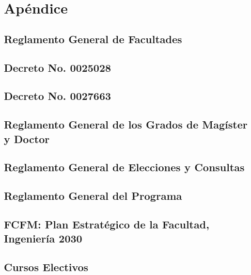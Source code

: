 \documentclass[11pt,fleqn]{book} %
\begin{document}
\iffalse

\appendix
{}
\chapter{Apéndice}

\section{Reglamento General de Facultades}\label{reg_gen_fac}


\section{Decreto No. 0025028}\label{dec25028}


\section{Decreto No. 0027663}\label{dec27663}


\section{Reglamento General de los Grados de Magíster y Doctor}\label{reg_mag_doc}


\section{Reglamento General de Elecciones y Consultas}\label{reg_elec_cons}


\section{Reglamento General del Programa}\label{reg_mirc}


\section{FCFM: Plan Estratégico de la Facultad, Ingeniería 2030}\label{fcfm_plan_2030}


\section{Cursos Electivos}\label{electivos}

\end{document}
